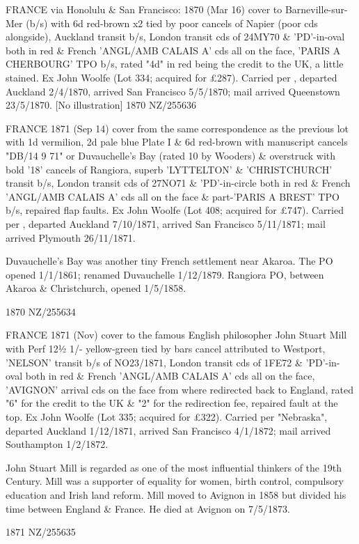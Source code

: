 \documentclass[justified]{tufte-book}
\begin{document}
%
{ FRANCE via Honolulu \& San Francisco: 1870 (Mar 16) cover to Barneville-sur-Mer (b/s) with 6d red-brown x2 tied by poor cancels of Napier (poor cds alongside), Auckland transit b/s, London transit cds of 24MY70 \& 'PD'-in-oval both in red \& French 'ANGL/AMB CALAIS A' cds all on the face, 'PARIS A CHERBOURG' TPO b/s, rated "4d" in red being the credit to the UK, a little stained. Ex John Woolfe (Lot 334; acquired for \pounds{287}). Carried per , departed Auckland 2/4/1870, arrived San Francisco 5/5/1870; mail arrived Queenstown 23/5/1870. [No illustration]}%
{1870}%
{NZ/255636}%
{}%
{}
{}%
{}


%
{FRANCE 1871 (Sep 14) cover from the same correspondence as the previous lot with 1d vermilion, 2d pale blue Plate I \& 6d red-brown with manuscript cancels "DB/14 9 71" or Duvauchelle's Bay (rated 10 by Wooders) \& overstruck with bold '18' cancels of Rangiora, superb 'LYTTELTON' \& 'CHRISTCHURCH' transit b/s, London transit cds of 27NO71 \& 'PD'-in-circle both in red \& French 'ANGL/AMB CALAIS A' cds all on the face \& part-'PARIS A BREST' TPO b/s, repaired flap faults. Ex John Woolfe (Lot 408; acquired for \pounds{747}). Carried per , departed Auckland 7/10/1871, arrived San Francisco 5/11/1871; mail arrived Plymouth 26/11/1871.

Duvauchelle's Bay was another tiny French settlement near Akaroa. The PO opened 1/1/1861; renamed Duvauchelle 1/12/1879. Rangiora PO, between Akaroa \& Christchurch, opened 1/5/1858.}%
{1870}%
{NZ/255634}%
{}%
{}
{}%
{}

%
{FRANCE 1871 (Nov) cover to the famous English philosopher John Stuart Mill with Perf 12½ 1/- yellow-green tied by bars cancel attributed to Westport, 'NELSON' transit b/s of NO23/1871, London transit cds of 1FE72 \& 'PD'-in-oval both in red \& French 'ANGL/AMB CALAIS A' cds all on the face, 'AVIGNON' arrival cds on the face from where redirected back to England, rated "6" for the credit to the UK \& "2" for the redirection fee, repaired fault at the top. Ex John Woolfe (Lot 335; acquired for £322). Carried per "Nebraska", departed Auckland 1/12/1871, arrived San Francisco 4/1/1872; mail arrived Southampton 1/2/1872.

John Stuart Mill is regarded as one of the most influential thinkers of the 19th Century. Mill was a supporter of equality for women, birth control, compulsory education and Irish land reform. Mill moved to Avignon in 1858 but divided his time between England \& France. He died at Avignon on 7/5/1873.}%
{1871}%
{NZ/255635}%
{}%
{}
{}%
{}
\end{document}
